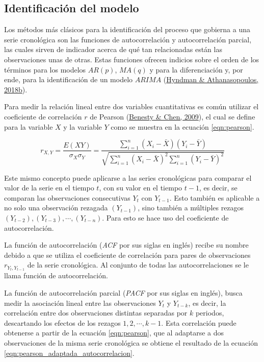 \documentclass[
]{article}
\begin{document}
\subsection{Identificación del modelo}

Los métodos más clásicos para la identificación del proceso que gobierna
a una serie cronológica son las funciones de autocorrelación y
autocorrelación parcial, las cuales sirven de indicador acerca de qué
tan relacionadas están las observaciones unas de otras. Estas funciones
ofrecen indicios sobre el orden de los términos para los modelos
\(AR(p)\), \(MA(q)\) y para la diferenciación y, por ende, para la
identificación de un modelo \(ARIMA\)
(\protect\hyperlink{ref-hyndman_box-jenkins}{Hyndman \& Athanasopoulos,
2018b}).

Para medir la relación lineal entre dos variables cuantitativas es común
utilizar el coeficiente de correlación \(r\) de Pearson
(\protect\hyperlink{ref-pearson}{Benesty \& Chen, 2009}), el cual se
define para la variable \(X\) y la variable \(Y\) como se muestra en la
ecuación \eqref{eqn:pearson}.

\begin{equation}
\label{eqn:pearson}
r_{X,Y}=\frac{E(XY)}{\sigma_X \sigma_Y} = \frac{\sum_{i=1}^n \left(X_i- \bar X\right) \left(Y_i- \bar Y\right)}{\sqrt{\sum_{i=1}^n \left(X_i- \bar X\right)^2 \sum_{i=1}^n \left(Y_i- \bar Y\right)^2}}
\end{equation}

Este mismo concepto puede aplicarse a las series cronológicas para
comparar el valor de la serie en el tiempo \(t\), con su valor en el
tiempo \(t-1\), es decir, se comparan las observaciones consecutivas
\(Y_t\) con \(Y_{t-1}\). Esto también es aplicable a no solo una
observación rezagada \((Y_{t-1})\), sino también a múltiples rezagos
\((Y_{t-2}), (Y_{t-3}), \cdots,(Y_{t-n})\). Para esto se hace uso del
coeficiente de autocorrelación.

La función de autocorrelación (\emph{ACF} por sus siglas en inglés)
recibe su nombre debido a que se utiliza el coeficiente de correlación
para pares de observaciones \(r_{Y_t, Y_{t-1}}\) de la serie
cronológica. Al conjunto de todas las autocorrelaciones se le llama
función de autocorrelación.

La función de autocorrelación parcial (\emph{PACF} por sus siglas en
inglés), busca medir la asociación lineal entre las observaciones
\(Y_t\) y \(Y_{t-k}\), es decir, la correlación entre dos observaciones
distintas separadas por \(k\) periodos, descartando los efectos de los
rezagos \(1,2, \cdots ,k-1\). Esta correlación puede obtenerse a partir
de la ecuación \eqref{eqn:pearson}, que al adaptarse a dos observaciones
de la misma serie cronológica se obtiene el resultado de la ecuación
\eqref{eqn:pearson_adaptada_autocorrelacion}.
\end{document}
